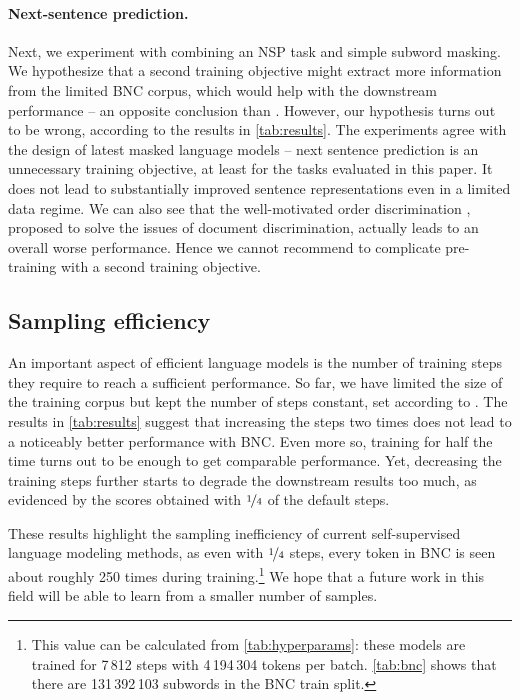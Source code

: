     \paragraph{Next-sentence prediction.} Next, we experiment with combining an NSP task and simple subword masking. We hypothesize that a second training objective might extract more information from the limited BNC corpus, which would help with the downstream performance -- an opposite conclusion than . However, our hypothesis turns out to be wrong, according to the results in \cref{tab:results}. The experiments agree with the design of latest masked language models -- next sentence prediction is an unnecessary training objective, at least for the tasks evaluated in this paper. It does not lead to substantially improved sentence representations even in a limited data regime. We can also see that the well-motivated order discrimination \citep{Lan2020ALBERT}, proposed to solve the issues of document discrimination, actually leads to an overall worse performance. Hence we cannot recommend to complicate pre-training with a second training objective.
    

    \subsection{Sampling efficiency}
    \label{sec:sample-efficiency}
    
    An important aspect of efficient language models is the number of training steps they require to reach a sufficient performance. So far, we have limited the size of the training corpus but kept the number of steps constant, set according to . The results in \cref{tab:results} suggest that increasing the steps two times does not lead to a noticeably better performance with BNC. Even more so, training for half the time turns out to be enough to get comparable performance. Yet, decreasing the training steps further starts to degrade the downstream results too much, as evidenced by the scores obtained with $\nicefrac{1}{4}$ of the default steps.
    
    These results highlight the sampling inefficiency of current self-supervised language modeling methods, as even with $\nicefrac{1}{4}$ steps, every token in BNC is seen about roughly 250 times during training.\footnote{This value can be calculated from \cref{tab:hyperparams}: these models are trained for 7\,812 steps with 4\,194\,304 tokens per batch. \cref{tab:bnc} shows that there are 131\,392\,103 subwords in the BNC train split.} We hope that a future work in this field will be able to learn from a smaller number of samples.
    
